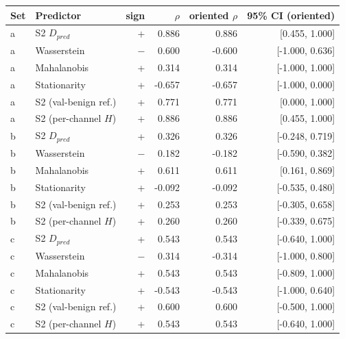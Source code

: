 \begin{tabular}{llrrrr}
\toprule
Set & Predictor & sign & $\rho$ & oriented $\rho$ & 95\% CI (oriented) \\
\midrule
a & S2 $D_{pred}$ & + & 0.886 & 0.886 & [0.455, 1.000] \\
a & Wasserstein & $-$ & 0.600 & -0.600 & [-1.000, 0.636] \\
a & Mahalanobis & + & 0.314 & 0.314 & [-1.000, 1.000] \\
a & Stationarity & + & -0.657 & -0.657 & [-1.000, 0.000] \\
a & S2 (val-benign ref.) & + & 0.771 & 0.771 & [0.000, 1.000] \\
a & S2 (per-channel $H$) & + & 0.886 & 0.886 & [0.455, 1.000] \\
\midrule
b & S2 $D_{pred}$ & + & 0.326 & 0.326 & [-0.248, 0.719] \\
b & Wasserstein & $-$ & 0.182 & -0.182 & [-0.590, 0.382] \\
b & Mahalanobis & + & 0.611 & 0.611 & [0.161, 0.869] \\
b & Stationarity & + & -0.092 & -0.092 & [-0.535, 0.480] \\
b & S2 (val-benign ref.) & + & 0.253 & 0.253 & [-0.305, 0.658] \\
b & S2 (per-channel $H$) & + & 0.260 & 0.260 & [-0.339, 0.675] \\
\midrule
c & S2 $D_{pred}$ & + & 0.543 & 0.543 & [-0.640, 1.000] \\
c & Wasserstein & $-$ & 0.314 & -0.314 & [-1.000, 0.800] \\
c & Mahalanobis & + & 0.543 & 0.543 & [-0.809, 1.000] \\
c & Stationarity & + & -0.543 & -0.543 & [-1.000, 0.640] \\
c & S2 (val-benign ref.) & + & 0.600 & 0.600 & [-0.500, 1.000] \\
c & S2 (per-channel $H$) & + & 0.543 & 0.543 & [-0.640, 1.000] \\
\bottomrule
\end{tabular}
